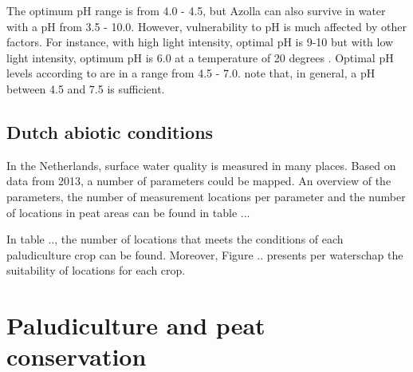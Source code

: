 \documentclass[a4paper,12pt]{scrbook}
\begin{document}
The optimum pH range is from 4.0 - 4.5, but Azolla can also survive in water with a pH from 3.5 - 10.0. However, vulnerability to pH is much affected by other factors. For instance, with high light intensity, optimal pH is 9-10 but with low light intensity, optimum pH is 6.0 at a temperature of 20 degrees \citep{wagner1997azolla}. Optimal pH levels according to \citet{lumpkin1980azolla} are in a range from 4.5 - 7.0. \citet{sabetraftar2013review} note that, in general, a pH between 4.5 and 7.5 is sufficient.





\section{Dutch abiotic conditions}

In the Netherlands, surface water quality is measured in many places. Based on data from 2013, a number of parameters could be mapped. An overview of the parameters, the number of measurement locations per parameter and the number of locations in peat areas can be found in table ... 

In table .., the number of locations that meets the conditions of each paludiculture crop can be found. Moreover, Figure .. presents per waterschap the suitability of locations for each crop. 


\chapter{Paludiculture and peat conservation}
\end{document}
